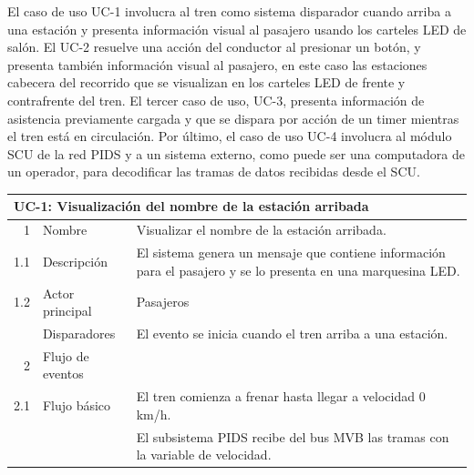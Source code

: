 El caso de uso UC-1 involucra al tren como sistema disparador cuando arriba a una estación y presenta información visual al pasajero usando los carteles LED de salón. El UC-2 resuelve una acción del conductor al presionar un botón, y presenta también información visual al pasajero, en este caso las estaciones cabecera del recorrido que se visualizan en los carteles LED de frente y contrafrente del tren. El tercer caso de uso, UC-3, presenta información de asistencia previamente cargada y que se dispara por acción de un timer mientras el tren está en circulación. Por último, el caso de uso UC-4 involucra al módulo SCU de la red PIDS y a un sistema externo, como puede ser una computadora de un operador, para decodificar las tramas de datos recibidas desde el SCU.\\


\begin{table}[]
\centering
\begin{tabular}{|lll|}
\hline
 
\multicolumn{3}{|l|}{{ \textbf{UC-1: Visualización del nombre de la estación arribada}}} \\ \hline
 
\multicolumn{1}{|r|}{{ 1}} & \multicolumn{1}{l|}{{ Nombre}} & { Visualizar el nombre de la estación arribada.} \\ \hline
 
\multicolumn{1}{|r|}{{ 1.1}} & \multicolumn{1}{l|}{{ Descripción}} & { El sistema genera un mensaje que contiene información para el pasajero y se lo presenta en una marquesina LED.} \\ \hline
 
\multicolumn{1}{|r|}{{ 1.2}} & \multicolumn{1}{l|}{{ Actor principal}} & { Pasajeros} \\ \hline
 
\multicolumn{1}{|l|}{{ }} & \multicolumn{1}{l|}{{ Disparadores}} & { El evento se inicia cuando el tren arriba a una estación.} \\ \hline
 
\multicolumn{1}{|r|}{{ 2}} & \multicolumn{1}{l|}{{ Flujo de eventos}} & { } \\ \hline
 
\multicolumn{1}{|r|}{{ 2.1}} & \multicolumn{1}{l|}{{ Flujo básico}} & { El tren comienza a frenar hasta llegar a velocidad 0 km/h.} \\
 
\multicolumn{1}{|l|}{{ }} & \multicolumn{1}{l|}{{ }} & { El subsistema PIDS recibe del bus MVB las tramas con la variable de velocidad.} \\
 

\end{tabular}
\end{table}

